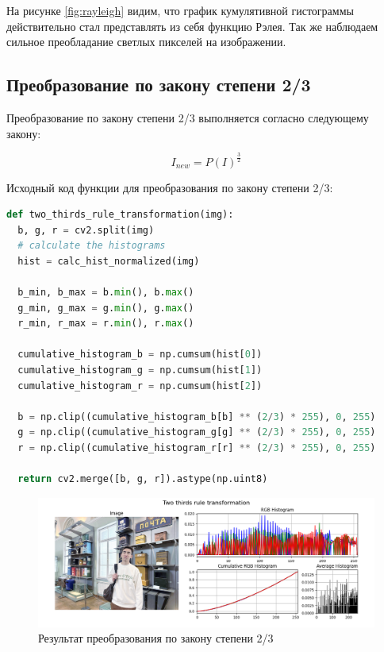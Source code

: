 На рисунке \ref{fig:rayleigh} видим, что график кумулятивной гистограммы действительно стал представлять из себя функцию Рэлея. Так же наблюдаем сильное преобладание светлых пикселей на изображении. 

\subsection{Преобразование по закону степени 2/3}

Преобразование по закону степени 2/3 выполняется согласно следующему закону:

\begin{equation}
  I_{new} = P(I)^{\frac{3}{2}}
\end{equation}

Исходный код функции для преобразования по закону степени 2/3:

\begin{lstlisting}[language=Python]
def two_thirds_rule_transformation(img):
  b, g, r = cv2.split(img)
  # calculate the histograms
  hist = calc_hist_normalized(img)

  b_min, b_max = b.min(), b.max()
  g_min, g_max = g.min(), g.max()
  r_min, r_max = r.min(), r.max()

  cumulative_histogram_b = np.cumsum(hist[0]) 
  cumulative_histogram_g = np.cumsum(hist[1])
  cumulative_histogram_r = np.cumsum(hist[2])

  b = np.clip((cumulative_histogram_b[b] ** (2/3) * 255), 0, 255)
  g = np.clip((cumulative_histogram_g[g] ** (2/3) * 255), 0, 255)
  r = np.clip((cumulative_histogram_r[r] ** (2/3) * 255), 0, 255)
  
  return cv2.merge([b, g, r]).astype(np.uint8)
\end{lstlisting}

\begin{figure}[H]
    \centering
    \includegraphics[width=\textwidth]{../results/Two thirds rule transformation.png}
    \caption{Результат преобразования по закону степени 2/3}
    \label{fig:two_thirds}
\end{figure}

